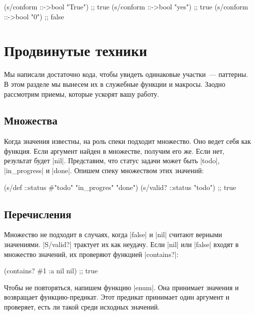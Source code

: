 \begin{english}
  \begin{clojure}
(s/conform ::->bool "True") ;; true
(s/conform ::->bool "yes")  ;; true
(s/conform ::->bool "0")    ;; false
  \end{clojure}
\end{english}

\section{Продвинутые техники}

Мы написали достаточно кода, чтобы увидеть одинаковые участки~--- паттерны. В
этом разделе мы вынесем их в служебные функции и макросы. Заодно рассмотрим
приемы, которые ускорят вашу работу.

\subsection{Множества}

Когда значения известны, на роль спеки подходит множество. Оно ведет себя как
функция. Если аргумент найден в множестве, получим его же. Если нет, результат
будет \spverb|nil|. Представим, что статус задачи может быть \spverb|todo|,
\spverb|in_progress| и \spverb|done|. Опишем спеку множеством этих значений:

\begin{english}
  \begin{clojure}
(s/def ::status #{"todo" "in_progres" "done"})
(s/valid? ::status "todo") ;; true
  \end{clojure}
\end{english}

\subsection{Перечисления}

Множество не подходит в случаях, когда \spverb|false| и \spverb|nil| считают
верными значениями. \spverb|S/valid?| трактует их как неудачу. Если \spverb|nil|
или \spverb|false| входят в множество значений, их проверяют функцией
\spverb|contains?|:

\begin{english}
  \begin{clojure}
(contains? #{1 :a nil} nil) ;; true
  \end{clojure}
\end{english}

Чтобы не повторяться, напишем функцию \spverb|enum|. Она принимает значения и
возвращает функцию-предикат. Этот предикат принимает один аргумент и проверяет,
есть ли такой среди исходных значений.

